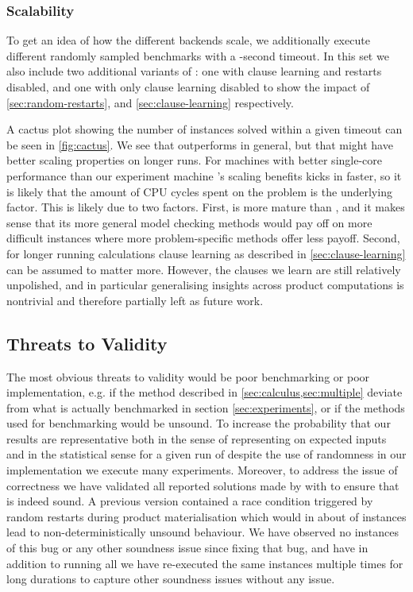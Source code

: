 \subsubsection{Scalability}\label{sec:scaling}%
To get an idea of how the different backends scale, we additionally execute
 different randomly sampled benchmarks with a
-second timeout. In this set we also include two additional
variants of \Calculus{}: one with clause learning and restarts disabled, and one
with only clause learning disabled to show the impact of
\cref{sec:random-restarts}, and \cref{sec:clause-learning} respectively.

A cactus plot showing the number of instances solved within a given timeout can
be seen in \cref{fig:cactus}. We see that \Calculus{} outperforms \Nuxmv{} in
general, but that \Nuxmv{} might have better scaling properties on longer runs.
For machines with better single-core performance than our experiment machine
\Nuxmv{}'s scaling benefits kicks in faster, so it is likely that the amount of
CPU cycles spent on the problem is the underlying factor. This is likely due to
two factors. First, \Nuxmv{} is more mature than \Calculus{}, and it makes sense
that its more general model checking methods would pay off on more difficult
instances where more problem-specific methods offer less payoff. Second, for
longer running calculations clause learning as described in
\cref{sec:clause-learning} can be assumed to matter more. However, the clauses
we learn are still relatively unpolished, and in particular generalising
insights across product computations is nontrivial and therefore partially left
as future work.

\subsection{Threats to Validity}

The most obvious threats to validity would be poor benchmarking or poor
implementation, e.g. if the method described in \cref{sec:calculus,sec:multiple}
deviate from what is actually benchmarked in section \cref{sec:experiments}, or
if the methods used for benchmarking would be unsound. To increase the
probability that our results are representative both in the sense of
representing  on expected inputs and in the statistical sense for a given run of
\Catra{} despite the use of randomness in our implementation we execute many
experiments. Moreover, to address the issue of correctness we have validated all
reported solutions made by \Calculus{} with \Nuxmv{} to ensure that \Calculus{}
is indeed sound. A previous version contained a race condition triggered by
random restarts during product materialisation which would in about
 of instances lead to non-deterministically unsound behaviour. We
have observed no instances of this bug or any other soundness issue since fixing
that bug, and have in addition to running all \NrBenchmarks{} we have
re-executed the same instances multiple times for long durations to capture
other soundness issues without any issue.

